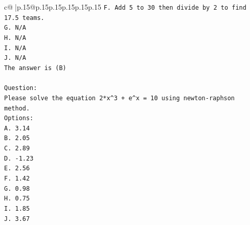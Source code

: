 \documentclass{article}
\begin{document}
{\begin{supertabular}{c@{$\;$}|p{.15\linewidth}@{}p{.15\linewidth}p{.15\linewidth}p{.15\linewidth}p{.15\linewidth}p{.15\linewidth}}
{{{\texttt{F. Add 5 to 30 then divide by 2 to find 17.5 teams.} \\
\texttt{G. N/A} \\
\texttt{H. N/A} \\
\texttt{I. N/A} \\
\texttt{J. N/A} \\
\texttt{The answer is (B)} \\
\\ 
\texttt{Question:} \\
\texttt{Please solve the equation 2*x\^{}3 + e\^{}x = 10 using newton{-}raphson method.} \\
\texttt{Options:} \\
\texttt{A. 3.14} \\
\texttt{B. 2.05} \\
\texttt{C. 2.89} \\
\texttt{D. {-}1.23} \\
\texttt{E. 2.56} \\
\texttt{F. 1.42} \\
\texttt{G. 0.98} \\
\texttt{H. 0.75} \\
\texttt{I. 1.85} \\
\texttt{J. 3.67} \\
            }
        }
    }
     \\ \\


\end{supertabular}}
\end{document}
